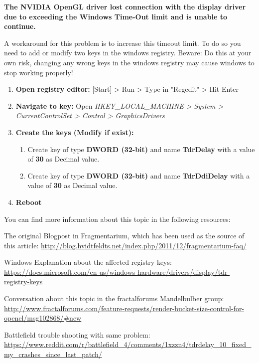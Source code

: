 \textbf{The NVIDIA OpenGL driver lost connection with the display driver due to exceeding the Windows Time-Out limit and is unable to continue.}

A workaround for this problem is to increase this timeout limit. To do so you need to add or modify two keys in the windows registry. Beware: Do this at your own risk, changing any wrong keys in the windows registry may cause windows to stop working properly!

\begin{enumerate}
	
	\item \textbf{Open registry editor:} [Start] > Run > Type in "Regedit" > Hit Enter
	\item \textbf{Navigate to key:} Open \emph{HKEY\_LOCAL\_MACHINE > System > CurrentControlSet > Control > GraphicsDrivers}
	\item \textbf{Create the keys (Modify if exist):}
	\begin{enumerate}
		\item Create key of type \textbf{DWORD (32-bit)} and name \textbf{TdrDelay} with a value of \textbf{30} as Decimal value.
		\item Create key of type \textbf{DWORD (32-bit)} and name \textbf{TdrDdiDelay} with a value of \textbf{30} as Decimal value.	
	\end{enumerate}	
	\item \textbf{Reboot}

\end{enumerate}

You can find more information about this topic in the following resources:

The original Blogpost in Fragmentarium, which has been used as the source of this article: \url{http://blog.hvidtfeldts.net/index.php/2011/12/fragmentarium-faq/}

Windows Explanation about the affected registry keys: \url{https://docs.microsoft.com/en-us/windows-hardware/drivers/display/tdr-registry-keys}

Conversation about this topic in the fractalforums Mandelbulber group:
\url{http://www.fractalforums.com/feature-requests/render-bucket-size-control-for-opencl/msg102868/#new}

Battlefield trouble shooting with same problem:
\url{https://www.reddit.com/r/battlefield_4/comments/1xzzn4/tdrdelay_10_fixed_my_crashes_since_last_patch/}